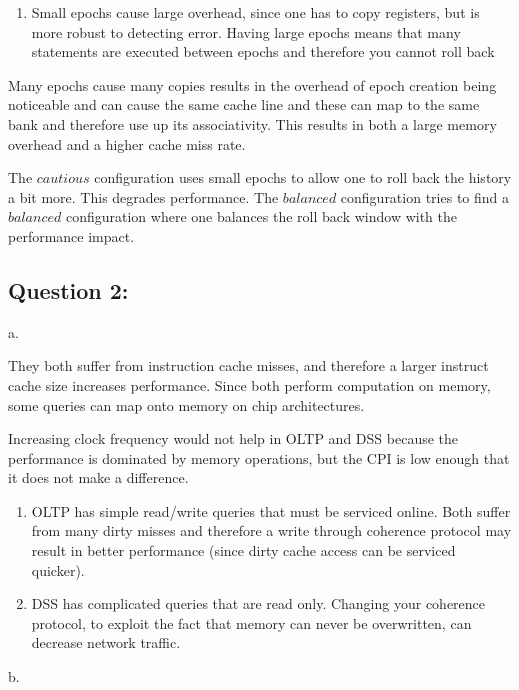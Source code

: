 \begin{enumerate}
\def\labelenumi{\alph{enumi}.}
\setcounter{enumi}{3}
\itemsep1pt\parskip0pt
\item
  Small epochs cause large overhead, since one has to copy registers,
  but is more robust to detecting error. Having large epochs means that
  many statements are executed between epochs and therefore you cannot
  roll back
\end{enumerate}

Many epochs cause many copies results in the overhead of epoch creation
being noticeable and can cause the same cache line and these can map to
the same bank and therefore use up its associativity. This results in
both a large memory overhead and a higher cache miss rate.

The $cautious$ configuration uses small epochs to allow one to roll back
the history a bit more. This degrades performance. The $balanced$
configuration tries to find a $balanced$ configuration where one
balances the roll back window with the performance impact.

\subsection{Question 2:}\label{question-2}

a.

They both suffer from instruction cache misses, and therefore a larger
instruct cache size increases performance. Since both perform
computation on memory, some queries can map onto memory on chip
architectures.

Increasing clock frequency would not help in OLTP and DSS because the
performance is dominated by memory operations, but the CPI is low enough
that it does not make a difference.

\begin{enumerate}
\def\labelenumi{\arabic{enumi}.}
\item
  OLTP has simple read/write queries that must be serviced online. Both
  suffer from many dirty misses and therefore a write through coherence
  protocol may result in better performance (since dirty cache access
  can be serviced quicker).
\item
  DSS has complicated queries that are read only. Changing your
  coherence protocol, to exploit the fact that memory can never be
  overwritten, can decrease network traffic.
\end{enumerate}

b.

